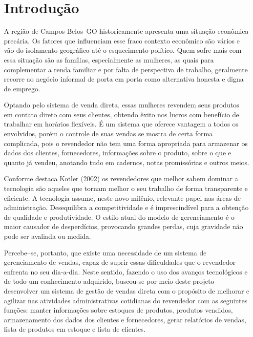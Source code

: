 \documentclass[chapter=TITLE,12pt,oneside,a4paper,english,french,sumario=tradicional,spanish,brazil,]{abntex2}
\begin{document}
\begin{SingleSpace}
\tableofcontents*
\thispagestyle{empty}
\end{SingleSpace}
\textual %
\setcounter{page}{7}  %
\chapter*{Introdução}
A região de Campos Belos–GO historicamente apresenta uma situação econômica precária. Os fatores que influenciam esse fraco contexto econômico são vários e vão do isolamento geográfico até o esquecimento político. Quem sofre mais com essa situação são as famílias, especialmente as mulheres, as quais para complementar a renda familiar e por falta de perspectiva de trabalho, geralmente recorre ao negócio informal de porta em porta como alternativa honesta e digna de emprego.

Optando pelo sistema de venda direta, essas mulheres revendem seus produtos em contato direto com seus clientes, obtendo êxito nos lucros com benefício de trabalhar em horários flexíveis. É um sistema que oferece vantagem a todos os envolvidos, porém o controle de suas vendas se mostra de certa forma complicada, pois o revendedor não tem uma forma apropriada para armazenar os dados dos clientes, fornecedores, informações sobre o produto, sobre o que e quanto já vendeu, anotando tudo em cadernos, notas promissórias e outros meios.

Conforme destaca Kotler (2002) os revendedores que melhor sabem dominar a tecnologia são aqueles que tornam melhor o seu trabalho de forma transparente e eficiente. A tecnologia assume, neste novo milênio, relevante papel nas áreas de administração. Desequilibra a competitividade e é imprescindível para a obtenção de qualidade e produtividade. O estilo atual do modelo de gerenciamento é o maior causador de desperdícios, provocando grandes perdas, cuja gravidade não pode ser avaliada ou medida.

Percebe–se, portanto, que existe uma necessidade de um sistema de gerenciamento de vendas, capaz de suprir essas dificuldades que o revendedor enfrenta no seu dia-a-dia. Neste sentido, fazendo o uso dos avanços tecnológicos e de todo um conhecimento adquirido, buscou-se por meio deste projeto desenvolver um sistema de gestão de vendas direta com o propósito de melhorar e agilizar nas atividades administrativas cotidianas do revendedor com as seguintes funções: manter informações sobre estoques de produtos, produtos vendidos, armazenamento dos dados dos clientes e fornecedores, gerar relatórios de vendas, lista de produtos em estoque e lista de clientes.
\end{document}
